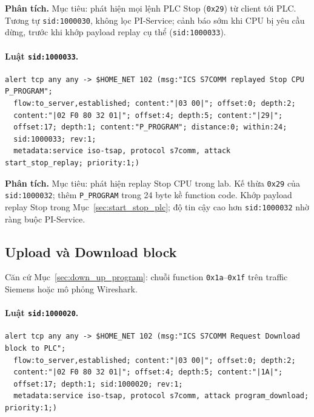 \documentclass[../main.tex]{subfiles}
\begin{document}
\noindent\textbf{Phân tích.}
Mục tiêu: phát hiện mọi lệnh PLC Stop (\texttt{0x29}) từ client tới PLC. Tương tự \texttt{sid:1000030}, không lọc PI-Service; cảnh báo sớm khi CPU bị yêu cầu dừng, trước khi khớp payload replay cụ thể (\texttt{sid:1000033}).

\paragraph{Luật \texttt{sid:1000033}.}
\begin{footnotesize}
\begin{verbatim}
alert tcp any any -> $HOME_NET 102 (msg:"ICS S7COMM replayed Stop CPU P_PROGRAM";
  flow:to_server,established; content:"|03 00|"; offset:0; depth:2;
  content:"|02 F0 80 32 01|"; offset:4; depth:5; content:"|29|";
  offset:17; depth:1; content:"P_PROGRAM"; distance:0; within:24;
  sid:1000033; rev:1;
  metadata:service iso-tsap, protocol s7comm, attack start_stop_replay; priority:1;)
\end{verbatim}
\end{footnotesize}

\noindent\textbf{Phân tích.}
Mục tiêu: phát hiện replay Stop CPU trong lab. Kế thừa \texttt{0x29} của \texttt{sid:1000032}; thêm \texttt{P\_PROGRAM} trong 24 byte kề function code. Khớp payload replay Stop trong Mục~\ref{sec:start_stop_plc}; độ tin cậy cao hơn \texttt{sid:1000032} nhờ ràng buộc PI-Service.

\subsection{Upload và Download block}
\label{sec:rules-up-download}

Căn cứ Mục~\ref{sec:down_up_program}: chuỗi function \texttt{0x1a}--\texttt{0x1f} trên traffic Siemens hoặc mô phỏng Wireshark.

\paragraph{Luật \texttt{sid:1000020}.}
\begin{footnotesize}
\begin{verbatim}
alert tcp any any -> $HOME_NET 102 (msg:"ICS S7COMM Request Download block to PLC";
  flow:to_server,established; content:"|03 00|"; offset:0; depth:2;
  content:"|02 F0 80 32 01|"; offset:4; depth:5; content:"|1A|";
  offset:17; depth:1; sid:1000020; rev:1;
  metadata:service iso-tsap, protocol s7comm, attack program_download; priority:1;)
\end{verbatim}
\end{footnotesize}
\end{document}
